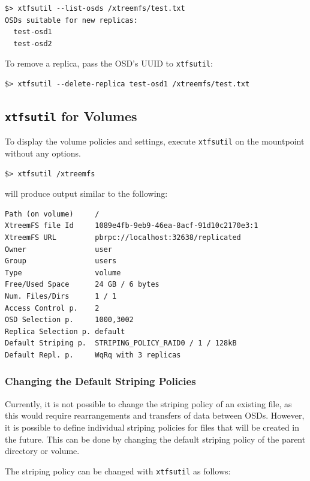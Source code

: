 \documentclass[a4paper,10pt]{book}
\begin{document}
\begin{verbatim}
$> xtfsutil --list-osds /xtreemfs/test.txt
OSDs suitable for new replicas: 
  test-osd1
  test-osd2
\end{verbatim}

To remove a replica, pass the OSD's UUID to \texttt{xtfsutil}:

\begin{verbatim}
$> xtfsutil --delete-replica test-osd1 /xtreemfs/test.txt
\end{verbatim}

\subsection{\texttt{xtfsutil} for Volumes}
\label{sec:xtfsutil_volumes}

To display the volume policies and settings, execute \texttt{xtfsutil} on the mountpoint without any options.

\begin{verbatim}
$> xtfsutil /xtreemfs
\end{verbatim}

will produce output similar to the following:

\begin{verbatim}
Path (on volume)     /
XtreemFS file Id     1089e4fb-9eb9-46ea-8acf-91d10c2170e3:1
XtreemFS URL         pbrpc://localhost:32638/replicated
Owner                user
Group                users
Type                 volume
Free/Used Space      24 GB / 6 bytes
Num. Files/Dirs      1 / 1
Access Control p.    2
OSD Selection p.     1000,3002
Replica Selection p. default
Default Striping p.  STRIPING_POLICY_RAID0 / 1 / 128kB
Default Repl. p.     WqRq with 3 replicas
\end{verbatim}


\subsubsection{Changing the Default Striping Policies}

Currently, it is not possible to change the striping policy of an existing file, as this would require rearrangements and transfers of data between OSDs. However, it is possible to define individual striping policies for files that will be created in the future. This can be done by changing the default striping policy of the parent directory or volume.

The striping policy can be changed with \texttt{xtfsutil} as follows:
\end{document}
